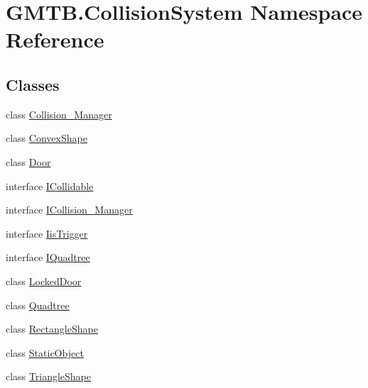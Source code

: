\hypertarget{namespace_g_m_t_b_1_1_collision_system}{}\section{G\+M\+T\+B.\+Collision\+System Namespace Reference}
\label{namespace_g_m_t_b_1_1_collision_system}
\subsection*{Classes}
\begin{DoxyCompactItemize}
\item 
class \mbox{\hyperlink{class_g_m_t_b_1_1_collision_system_1_1_collision___manager}{Collision\+\_\+\+Manager}}
\item 
class \mbox{\hyperlink{class_g_m_t_b_1_1_collision_system_1_1_convex_shape}{Convex\+Shape}}
\item 
class \mbox{\hyperlink{class_g_m_t_b_1_1_collision_system_1_1_door}{Door}}
\item 
interface \mbox{\hyperlink{interface_g_m_t_b_1_1_collision_system_1_1_i_collidable}{I\+Collidable}}
\item 
interface \mbox{\hyperlink{interface_g_m_t_b_1_1_collision_system_1_1_i_collision___manager}{I\+Collision\+\_\+\+Manager}}
\item 
interface \mbox{\hyperlink{interface_g_m_t_b_1_1_collision_system_1_1_iis_trigger}{Iis\+Trigger}}
\item 
interface \mbox{\hyperlink{interface_g_m_t_b_1_1_collision_system_1_1_i_quadtree}{I\+Quadtree}}
\item 
class \mbox{\hyperlink{class_g_m_t_b_1_1_collision_system_1_1_locked_door}{Locked\+Door}}
\item 
class \mbox{\hyperlink{class_g_m_t_b_1_1_collision_system_1_1_quadtree}{Quadtree}}
\item 
class \mbox{\hyperlink{class_g_m_t_b_1_1_collision_system_1_1_rectangle_shape}{Rectangle\+Shape}}
\item 
class \mbox{\hyperlink{class_g_m_t_b_1_1_collision_system_1_1_static_object}{Static\+Object}}
\item 
class \mbox{\hyperlink{class_g_m_t_b_1_1_collision_system_1_1_triangle_shape}{Triangle\+Shape}}
\end{DoxyCompactItemize}
